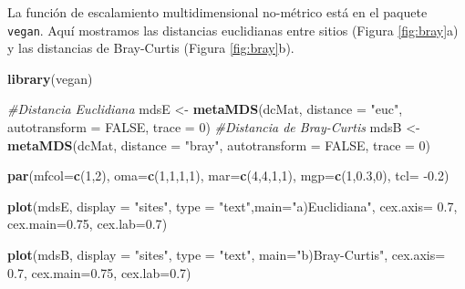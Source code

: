 \documentclass[]{book}
\newenvironment{Shaded}{\begin{snugshade}}{\end{snugshade}}
\newcommand{\KeywordTok}[1]{\textcolor[rgb]{0.13,0.29,0.53}{\textbf{{#1}}}}
\newcommand{\DataTypeTok}[1]{\textcolor[rgb]{0.13,0.29,0.53}{{#1}}}
\newcommand{\DecValTok}[1]{\textcolor[rgb]{0.00,0.00,0.81}{{#1}}}
\newcommand{\FloatTok}[1]{\textcolor[rgb]{0.00,0.00,0.81}{{#1}}}
\newcommand{\StringTok}[1]{\textcolor[rgb]{0.31,0.60,0.02}{{#1}}}
\newcommand{\CommentTok}[1]{\textcolor[rgb]{0.56,0.35,0.01}{\textit{{#1}}}}
\newcommand{\OtherTok}[1]{\textcolor[rgb]{0.56,0.35,0.01}{{#1}}}
\newcommand{\NormalTok}[1]{{#1}}
\begin{document}
La función de escalamiento multidimensional no-métrico está en el
paquete \texttt{vegan}. Aquí mostramos las distancias euclidianas entre
sitios (Figura \ref{fig:bray}a) y las distancias de Bray-Curtis (Figura
\ref{fig:bray}b).

\begin{Shaded}
\begin{Highlighting}[]
\KeywordTok{library}\NormalTok{(vegan) }

\CommentTok{#Distancia Euclidiana}
\NormalTok{mdsE <-}\StringTok{ }\KeywordTok{metaMDS}\NormalTok{(dcMat, }\DataTypeTok{distance =} \StringTok{"euc"}\NormalTok{, }\DataTypeTok{autotransform =} \OtherTok{FALSE}\NormalTok{, }\DataTypeTok{trace =} \DecValTok{0}\NormalTok{) }
\CommentTok{#Distancia de Bray-Curtis}
\NormalTok{mdsB <-}\StringTok{ }\KeywordTok{metaMDS}\NormalTok{(dcMat, }\DataTypeTok{distance =} \StringTok{"bray"}\NormalTok{, }\DataTypeTok{autotransform =} \OtherTok{FALSE}\NormalTok{, }\DataTypeTok{trace =} \DecValTok{0}\NormalTok{) }
\end{Highlighting}
\end{Shaded}

\begin{Shaded}
\begin{Highlighting}[]
\KeywordTok{par}\NormalTok{(}\DataTypeTok{mfcol=}\KeywordTok{c}\NormalTok{(}\DecValTok{1}\NormalTok{,}\DecValTok{2}\NormalTok{), }\DataTypeTok{oma=}\KeywordTok{c}\NormalTok{(}\DecValTok{1}\NormalTok{,}\DecValTok{1}\NormalTok{,}\DecValTok{1}\NormalTok{,}\DecValTok{1}\NormalTok{), }\DataTypeTok{mar=}\KeywordTok{c}\NormalTok{(}\DecValTok{4}\NormalTok{,}\DecValTok{4}\NormalTok{,}\DecValTok{1}\NormalTok{,}\DecValTok{1}\NormalTok{),}
    \DataTypeTok{mgp=}\KeywordTok{c}\NormalTok{(}\DecValTok{1}\NormalTok{,}\FloatTok{0.3}\NormalTok{,}\DecValTok{0}\NormalTok{), }\DataTypeTok{tcl=} \NormalTok{-}\FloatTok{0.2}\NormalTok{)}

\KeywordTok{plot}\NormalTok{(mdsE, }\DataTypeTok{display =} \StringTok{"sites"}\NormalTok{, }
     \DataTypeTok{type =} \StringTok{"text"}\NormalTok{,}\DataTypeTok{main=}\StringTok{"a)Euclidiana"}\NormalTok{, }
     \DataTypeTok{cex.axis=} \FloatTok{0.7}\NormalTok{, }\DataTypeTok{cex.main=}\FloatTok{0.75}\NormalTok{, }\DataTypeTok{cex.lab=}\FloatTok{0.7}\NormalTok{)}

\KeywordTok{plot}\NormalTok{(mdsB, }\DataTypeTok{display =} \StringTok{"sites"}\NormalTok{, }\DataTypeTok{type =} \StringTok{"text"}\NormalTok{, }
     \DataTypeTok{main=}\StringTok{"b)Bray-Curtis"}\NormalTok{, }
     \DataTypeTok{cex.axis=} \FloatTok{0.7}\NormalTok{, }\DataTypeTok{cex.main=}\FloatTok{0.75}\NormalTok{, }\DataTypeTok{cex.lab=}\FloatTok{0.7}\NormalTok{)}
\end{Highlighting}
\end{Shaded}
\end{document}
